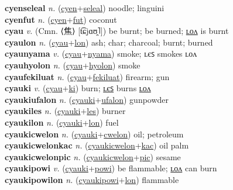 \textbf{cyenseleal} \textit{n.} (\hyperref[cyen]{cyen}+\hyperref[seleal]{seleal})
noodle; linguini \label{cyenseleal} \\
\textbf{cyenfut} \textit{n.} (\hyperref[cyen]{cyen}+\hyperref[fut]{fut})
coconut \label{cyenfut} \\
\textbf{cyau} \textit{v.} (Cmn. ⟨焦⟩ [t͡ɕjɑʊ̯˥])
be burnt; be burned; \hyperref[cyaulon]{ʟᴏᴧ} is burnt \label{cyau} \\
\textbf{cyaulon} \textit{n.} (\hyperref[cyau]{cyau}+\hyperref[lon]{lon})
ash; char; charcoal; burnt; burned \label{cyaulon} \\
\textbf{cyaunyama} \textit{v.} (\hyperref[cyau]{cyau}+\hyperref[nyama]{nyama})
smoke; ʟєꜱ smokes ʟᴏᴧ \label{cyaunyama} \\
\textbf{cyauhyolon} \textit{n.} (\hyperref[cyau]{cyau}+\hyperref[hyolon]{hyolon})
smoke \label{cyauhyolon} \\
\textbf{cyaufekiluat} \textit{n.} (\hyperref[cyau]{cyau}+\hyperref[fekiluat]{fekiluat})
firearm; gun \label{cyaufekiluat} \\
\textbf{cyauki} \textit{v.} (\hyperref[cyau]{cyau}+\hyperref[ki]{ki})
burn; \hyperref[cyaukiles]{ʟєꜱ} burns \hyperref[cyaukilon]{ʟᴏᴧ} \label{cyauki} \\
\textbf{cyaukiufalon} \textit{n.} (\hyperref[cyauki]{cyauki}+\hyperref[ufalon]{ufalon})
gunpowder \label{cyaukiufalon} \\
\textbf{cyaukiles} \textit{n.} (\hyperref[cyauki]{cyauki}+\hyperref[les]{les})
burner \label{cyaukiles} \\
\textbf{cyaukilon} \textit{n.} (\hyperref[cyauki]{cyauki}+\hyperref[lon]{lon})
fuel \label{cyaukilon} \\
\textbf{cyaukicwelon} \textit{n.} (\hyperref[cyauki]{cyauki}+\hyperref[cwelon]{cwelon})
oil; petroleum \label{cyaukicwelon} \\
\textbf{cyaukicwelonkac} \textit{n.} (\hyperref[cyaukicwelon]{cyaukicwelon}+\hyperref[kac]{kac})
oil palm \label{cyaukicwelonkac} \\
\textbf{cyaukicwelonpic} \textit{n.} (\hyperref[cyaukicwelon]{cyaukicwelon}+\hyperref[pic]{pic})
sesame \label{cyaukicwelonpic} \\
\textbf{cyaukipowi} \textit{v.} (\hyperref[cyauki]{cyauki}+\hyperref[powi]{powi})
be flammable; \hyperref[cyaukipowilon]{ʟᴏᴧ} can burn \label{cyaukipowi} \\
\textbf{cyaukipowilon} \textit{n.} (\hyperref[cyaukipowi]{cyaukipowi}+\hyperref[lon]{lon})
flammable \label{cyaukipowilon} \\

